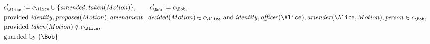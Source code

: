 \begin{align*}
&
c'_
{
\Alice
}
 := 
c_
{
\Alice
}
 \cup 
\{
\mathit{\detokenize{
amended
}}
,
\mathit{\detokenize{
taken
}}
(
Motion
)
\}
, \qquad 
c'_
{
\Bob
}
 := 
c_
{
\Bob
}
,\\
&
\text{provided } 
\mathit{\detokenize{
identity
}}
,
\mathit{\detokenize{
proposed
}}
(
Motion
)
,
\mathit{\detokenize{
amendment_decided
}}
(
Motion
)
 \in c_
{
\Alice
}
 \text{ and } 
\mathit{\detokenize{
identity
}}
,
\mathit{\detokenize{
officer
}}
(
\Alice
)
,
\mathit{\detokenize{
amender
}}
(
\Alice
,
Motion
)
,
\mathit{\detokenize{
person
}}
 \in c_
{
\Bob
}
,\\
&
\text{provided } 
\mathit{\detokenize{
taken
}}
(
Motion
)
 \notin c_
{
\Alice
}
,\\
&
\text{guarded by } \{
\Bob
\}
\end{align*}
